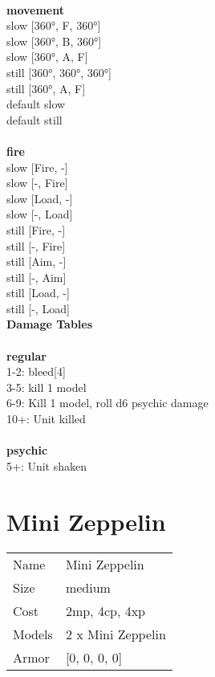 \ \\ {\bf movement } \\
slow [360°, F, 360°] \\
slow [360°, B, 360°] \\
slow [360°, A, F] \\
still [360°, 360°, 360°] \\
still [360°, A, F] \\
default slow \\
default still \\
\ \\ {\bf fire } \\
slow [Fire, -] \\
slow [-, Fire] \\
slow [Load, -] \\
slow [-, Load] \\
still [Fire, -] \\
still [-, Fire] \\
still [Aim, -] \\
still [-, Aim] \\
still [Load, -] \\
still [-, Load] \\


{\bf Damage Tables} \\
\ \\ {\bf regular } \\
1-2: bleed[4] \\
3-5: kill 1 model \\
6-9: Kill 1 model, roll d6 psychic damage \\
10+: Unit killed \\
\ \\ {\bf psychic } \\
5+: Unit shaken \\










\pagebreak\pagebreak

\section{ Mini Zeppelin }

\begin{tabular}{ll}
  Name & Mini Zeppelin \\
  Size & medium\\
  Cost & 2mp, 4cp, 4xp\\
  Models & 2 x Mini Zeppelin\\
  Armor & [0, 0, 0, 0]\\
\end{tabular}

